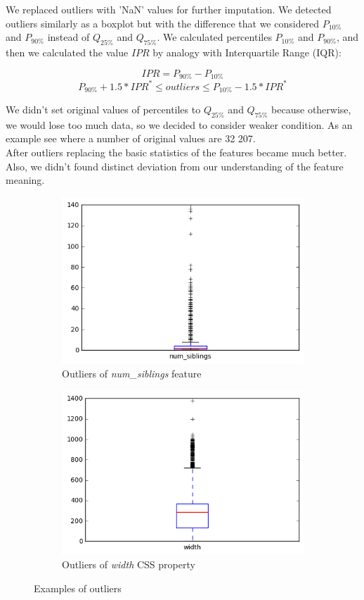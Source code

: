 We replaced outliers with 'NaN' values for further imputation. We detected outliers similarly as a boxplot but with the difference that we considered $P_{10\%}$ and $P_{90\%}$ instead of $Q_{25\%}$ and $Q_{75\%}$. We calculated percentiles $P_{10\%}$ and $P_{90\%}$, and then we calculated the value $IPR$ by analogy with Interquartile Range (IQR):

$$IPR =  P_{90\%} -  P_{10\%}$$
$$ P_{90\%} + 1.5 * IPR^* \leq outliers \leq P_{10\%} - 1.5 * IPR^* $$

We didn't set original values of percentiles to $Q_{25\%}$ and $Q_{75\%}$ because otherwise, we would lose too much data, so we decided to consider weaker condition. As an example see where a number of original values are 32 207.\\

After outliers replacing the basic statistics of the features became much better. Also, we didn't found distinct deviation from our understanding of the feature meaning.

\begin{figure}[h]
\begin{subfigure}{.5\textwidth}
  \centering
  \includegraphics[width=.8\linewidth]{figures06/boxplot_num_siblings}
  \caption{Outliers of \textit{num\_siblings} feature}
\end{subfigure}%
\begin{subfigure}{.5\textwidth}
  \centering
  \includegraphics[width=.8\linewidth]{figures06/boxplot_width}
  \caption{Outliers of \textit{width} CSS property}
\end{subfigure}
\caption{Examples of outliers}
\label{fig:outlier}
\end{figure}

